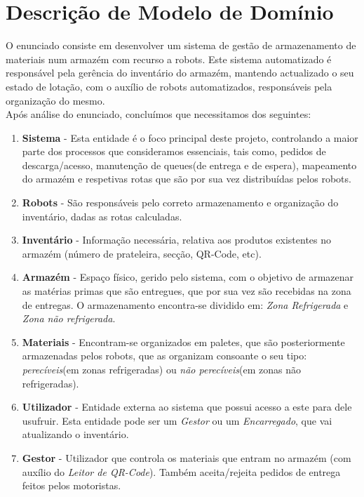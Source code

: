 \documentclass[a4paper]{report}
\begin{document}
\section{Descrição de Modelo de Domínio} 
O enunciado consiste em desenvolver um sistema de gestão de armazenamento de materiais num armazém com recurso a robots. Este sistema automatizado é responsável pela gerência do inventário do armazém, mantendo actualizado o seu estado de lotação, com o auxílio de robots automatizados, responsáveis pela organização do mesmo. \\
Após análise do enunciado, concluímos que necessitamos dos seguintes:
\begin{enumerate}
    \item \textbf{Sistema} - Esta entidade é o foco principal deste projeto, controlando a maior parte dos processos que consideramos essenciais, tais como, pedidos de descarga/acesso, manutenção de queues(de entrega e de espera), mapeamento do armazém e respetivas rotas que são por sua vez distribuídas pelos robots. \newline
    \item \textbf{Robots} - São responsáveis pelo correto armazenamento e organização do inventário, dadas as rotas calculadas. \newline
    \item \textbf{Inventário} - Informação necessária, relativa aos produtos existentes no armazém (número de prateleira, secção, QR-Code, etc). \newline
    \item \textbf{Armazém} - Espaço físico, gerido pelo sistema, com o objetivo de armazenar as matérias primas que são entregues, que por sua vez são recebidas na zona de entregas. O armazenamento encontra-se dividido em: \textit{Zona Refrigerada} e \textit{Zona não refrigerada}. \newline
    \item \textbf{Materiais} - Encontram-se organizados em paletes, que são posteriormente armazenadas pelos robots, que as organizam consoante o seu tipo: \textit{perecíveis}(em zonas refrigeradas) ou \textit{não perecíveis}(em zonas não refrigeradas). \newline
    \item \textbf{Utilizador} - Entidade externa ao sistema que possui acesso a este para dele usufruir. Esta entidade pode ser um \textit{Gestor} ou um \textit{Encarregado}, que vai atualizando o inventário. \newline
    \item \textbf{Gestor} - Utilizador que controla os materiais que entram no armazém (com auxílio do \textit{Leitor de QR-Code}). Também aceita/rejeita pedidos de entrega feitos pelos motoristas. \newline

\end{enumerate}
\end{document}
